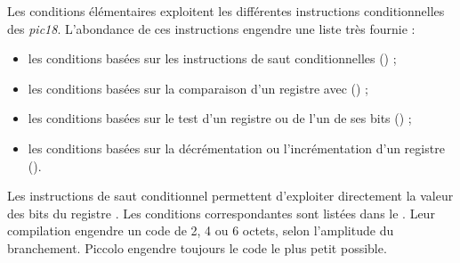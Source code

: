 





Les conditions élémentaires exploitent les différentes instructions conditionnelles des \emph{pic18}. L'abondance de ces instructions engendre une liste très fournie :
\begin{itemize}
  \item les conditions basées sur les instructions de saut conditionnelles () ;
  \item les conditions basées sur la comparaison d'un registre avec  () ;
  \item les conditions basées sur le test d'un registre ou de l'un de ses bits () ;
  \item les conditions basées sur la décrémentation ou l'incrémentation d'un registre ().
\end{itemize}


Les instructions de saut conditionnel permettent d'exploiter directement la valeur des bits du registre . Les conditions correspondantes sont listées dans le . Leur compilation engendre un code de 2, 4 ou 6 octets, selon l'amplitude du branchement. Piccolo engendre toujours le code le plus petit possible.

